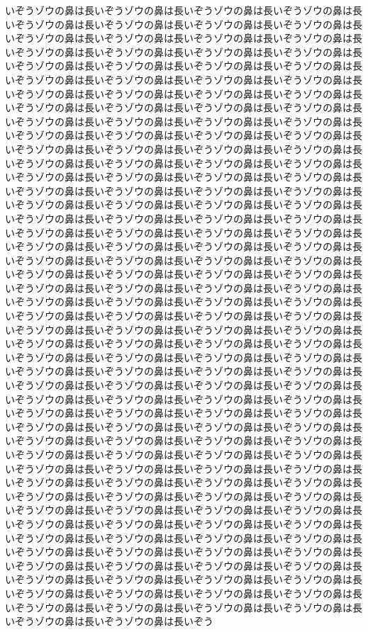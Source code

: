 いぞうゾウの鼻は長いぞうゾウの鼻は長いぞうゾウの鼻は長いぞうゾウの鼻は長いぞうゾウの鼻は長いぞうゾウの鼻は長いぞうゾウの鼻は長いぞうゾウの鼻は長いぞうゾウの鼻は長いぞうゾウの鼻は長いぞうゾウの鼻は長いぞうゾウの鼻は長いぞうゾウの鼻は長いぞうゾウの鼻は長いぞうゾウの鼻は長いぞうゾウの鼻は長いぞうゾウの鼻は長いぞうゾウの鼻は長いぞうゾウの鼻は長いぞうゾウの鼻は長いぞうゾウの鼻は長いぞうゾウの鼻は長いぞうゾウの鼻は長いぞうゾウの鼻は長いぞうゾウの鼻は長いぞうゾウの鼻は長いぞうゾウの鼻は長いぞうゾウの鼻は長いぞうゾウの鼻は長いぞうゾウの鼻は長いぞうゾウの鼻は長いぞうゾウの鼻は長いぞうゾウの鼻は長いぞうゾウの鼻は長いぞうゾウの鼻は長いぞうゾウの鼻は長いぞうゾウの鼻は長いぞうゾウの鼻は長いぞうゾウの鼻は長いぞうゾウの鼻は長いぞうゾウの鼻は長いぞうゾウの鼻は長いぞうゾウの鼻は長いぞうゾウの鼻は長いぞうゾウの鼻は長いぞうゾウの鼻は長いぞうゾウの鼻は長いぞうゾウの鼻は長いぞうゾウの鼻は長いぞうゾウの鼻は長いぞうゾウの鼻は長いぞうゾウの鼻は長いぞうゾウの鼻は長いぞうゾウの鼻は長いぞうゾウの鼻は長いぞうゾウの鼻は長いぞうゾウの鼻は長いぞうゾウの鼻は長いぞうゾウの鼻は長いぞうゾウの鼻は長いぞうゾウの鼻は長いぞうゾウの鼻は長いぞうゾウの鼻は長いぞうゾウの鼻は長いぞうゾウの鼻は長いぞうゾウの鼻は長いぞうゾウの鼻は長いぞうゾウの鼻は長いぞうゾウの鼻は長いぞうゾウの鼻は長いぞうゾウの鼻は長いぞうゾウの鼻は長いぞうゾウの鼻は長いぞうゾウの鼻は長いぞうゾウの鼻は長いぞうゾウの鼻は長いぞうゾウの鼻は長いぞうゾウの鼻は長いぞうゾウの鼻は長いぞうゾウの鼻は長いぞうゾウの鼻は長いぞうゾウの鼻は長いぞうゾウの鼻は長いぞうゾウの鼻は長いぞうゾウの鼻は長いぞうゾウの鼻は長いぞうゾウの鼻は長いぞうゾウの鼻は長いぞうゾウの鼻は長いぞうゾウの鼻は長いぞうゾウの鼻は長いぞうゾウの鼻は長いぞうゾウの鼻は長いぞうゾウの鼻は長いぞうゾウの鼻は長いぞうゾウの鼻は長いぞうゾウの鼻は長いぞうゾウの鼻は長いぞうゾウの鼻は長いぞうゾウの鼻は長いぞうゾウの鼻は長いぞうゾウの鼻は長いぞうゾウの鼻は長いぞうゾウの鼻は長いぞうゾウの鼻は長いぞうゾウの鼻は長いぞうゾウの鼻は長いぞうゾウの鼻は長いぞうゾウの鼻は長いぞうゾウの鼻は長いぞうゾウの鼻は長いぞうゾウの鼻は長いぞうゾウの鼻は長いぞうゾウの鼻は長いぞうゾウの鼻は長いぞうゾウの鼻は長いぞうゾウの鼻は長いぞうゾウの鼻は長いぞうゾウの鼻は長いぞうゾウの鼻は長いぞうゾウの鼻は長いぞうゾウの鼻は長いぞうゾウの鼻は長いぞうゾウの鼻は長いぞうゾウの鼻は長いぞうゾウの鼻は長いぞうゾウの鼻は長いぞうゾウの鼻は長いぞうゾウの鼻は長いぞうゾウの鼻は長いぞうゾウの鼻は長いぞうゾウの鼻は長いぞうゾウの鼻は長いぞうゾウの鼻は長いぞうゾウの鼻は長いぞうゾウの鼻は長いぞうゾウの鼻は長いぞうゾウの鼻は長いぞうゾウの鼻は長いぞうゾウの鼻は長いぞうゾウの鼻は長いぞうゾウの鼻は長いぞうゾウの鼻は長いぞうゾウの鼻は長いぞうゾウの鼻は長いぞうゾウの鼻は長いぞうゾウの鼻は長いぞうゾウの鼻は長いぞうゾウの鼻は長いぞうゾウの鼻は長いぞうゾウの鼻は長いぞうゾウの鼻は長いぞうゾウの鼻は長いぞうゾウの鼻は長いぞうゾウの鼻は長いぞうゾウの鼻は長いぞうゾウの鼻は長いぞうゾウの鼻は長いぞうゾウの鼻は長いぞうゾウの鼻は長いぞうゾウの鼻は長いぞうゾウの鼻は長いぞうゾウの鼻は長いぞうゾウの鼻は長いぞうゾウの鼻は長いぞうゾウの鼻は長いぞうゾウの鼻は長いぞうゾウの鼻は長いぞうゾウの鼻は長いぞうゾウの鼻は長いぞうゾウの鼻は長いぞうゾウの鼻は長いぞうゾウの鼻は長いぞうゾウの鼻は長いぞうゾウの鼻は長いぞうゾウの鼻は長いぞうゾウの鼻は長いぞうゾウの鼻は長いぞう